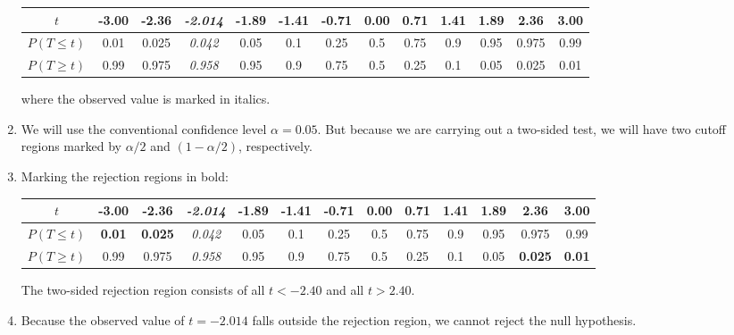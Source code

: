 \begin{enumerate}
  \begin{center}
    \begin{tabular}{c|c@{\gap}c@{\gap}c@{\gap}c@{\gap}
        c@{\gap}c@{\gap}c@{\gap}c@{\gap}c@{\gap}c@{\gap}c@{\gap}c}
      $t$ & -3.00 & -2.36 & \textit{-2.014} & -1.89 & -1.41 & -0.71 &
      0.00 & 0.71 & 1.41 & 1.89 & 2.36 & 3.00 \\ \hline
      $P(T\leq{t})$ & 0.01 & 0.025 & \textit{0.042} & 0.05 & 0.1 & 0.25 &
      0.5 & 0.75 & 0.9 & 0.95 & 0.975 & 0.99 \\
      $P(T\geq{t})$ & 0.99 & 0.975 & \textit{0.958} & 0.95 & 0.9 & 0.75 & 0.5 &
      0.25 & 0.1 & 0.05 & 0.025 & 0.01
    \end{tabular}
  \end{center}
  
  \noindent where the observed value is marked in italics.
  
\item We will use the conventional confidence level $\alpha =
  0.05$. But because we are carrying out a two-sided test, we will
  have two cutoff regions marked by $\alpha/2$ and $(1-\alpha/2)$,
  respectively.

\item Marking the rejection regions in bold:
  
  \begin{center}
    \begin{tabular}{c|c@{\gap}c@{\gap}c@{\gap}c@{\gap}
        c@{\gap}c@{\gap}c@{\gap}c@{\gap}c@{\gap}c@{\gap}c@{\gap}c}
      $t$ & \textbf{-3.00} & \textbf{-2.36} & \emph{-2.014} &
      -1.89 & -1.41 & -0.71 & 0.00 & 0.71 & 1.41 & 1.89 &
      \textbf{2.36} & \textbf{3.00} \\ \hline
      $P(T\leq{t})$ & \textbf{0.01} & \textbf{0.025} &
      \textit{0.042} & 0.05 & 0.1 & 0.25 &
      0.5 & 0.75 & 0.9 & 0.95 & 0.975 & 0.99 \\
      $P(T\geq{t})$ & 0.99 & 0.975 & \textit{0.958} & 0.95 & 0.9 & 0.75 & 0.5 &
      0.25 & 0.1 & 0.05 & \textbf{0.025} & \textbf{0.01}
    \end{tabular}
  \end{center}

  The two-sided rejection region consists of all $t<-2.40$ and all
  $t>{2.40}$.

\item Because the observed value of $t=-2.014$ falls outside the
  rejection region, we cannot reject the null hypothesis.

\end{enumerate}

